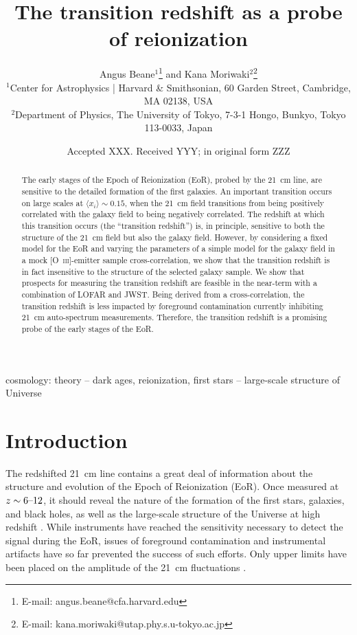 \documentclass[a4paper,fleqn,usenatbib]{mnras}
\title[The transition redshift]{The transition redshift as a probe of reionization}
\author[A. Beane and K. Moriwaki]{
Angus Beane$^{1}$\thanks{E-mail: angus.beane@cfa.harvard.edu}
and Kana Moriwaki$^{2}$\thanks{E-mail: kana.moriwaki@utap.phy.s.u-tokyo.ac.jp}
\\
$^{1}$Center for Astrophysics {\normalfont |} Harvard \& Smithsonian, 60 Garden Street, Cambridge, MA 02138, USA\\
$^{2}$Department of Physics, The University of Tokyo, 7-3-1 Hongo, Bunkyo, Tokyo 113-0033, Japan
}
\date{Accepted XXX. Received YYY; in original form ZZZ}
\newcommand{\avg}[1]{\ensuremath{\langle #1 \rangle}}
\begin{document}
\label{firstpage}
\pagerange{\pageref{firstpage}--\pageref{lastpage}}
\maketitle

\begin{abstract}
The early stages of the Epoch of Reionization (EoR), probed by the 21~cm line,
are sensitive to the detailed formation of the first galaxies. An important
transition occurs on large scales at $\avg{x_i}\sim0.15$, when the 21~cm field
transitions from being positively correlated with the galaxy field to being
negatively correlated. The redshift at which this transition occurs (the
``transition redshift'') is, in principle, sensitive to both the structure of
the 21~cm field but also the galaxy field. However, by considering a fixed
model for the EoR and varying the parameters of a simple model for the galaxy
field in a mock [O~\textsc{iii}]-emitter sample cross-correlation, we show
that the transition redshift is in fact insensitive to the structure of the
selected galaxy sample. We show that prospects for measuring the transition
redshift are feasible in the near-term with a combination of LOFAR and JWST.
Being derived from a cross-correlation, the transition redshift is less
impacted by foreground contamination currently inhibiting 21~cm auto-spectrum
measurements. Therefore, the transition redshift is a promising probe of the
early stages of the EoR.
\end{abstract}

\begin{keywords}
cosmology: theory -- dark ages, reionization, first stars -- large-scale
structure of Universe
\end{keywords}



\section{Introduction}
The redshifted 21~cm line contains a great deal of information about the
structure and evolution of the Epoch of Reionization (EoR). Once measured at
$z\sim6\textup{--}12$, it should reveal the nature of the formation of the
first stars, galaxies, and black holes, as well as the large-scale structure
of the Universe at high redshift \citep{2013fgu..book.....L}. While
instruments have reached the sensitivity necessary to detect the signal during
the EoR, issues of foreground contamination and instrumental artifacts have so
far prevented the success of such efforts. Only upper limits have been placed
on the amplitude of the 21~cm fluctuations \citep[e.g.][]{2013MNRAS.433..639P,
2014PhRvD..89b3002D, 2016ApJ...833..102B, 2017ApJ...838...65P}.
\end{document}
